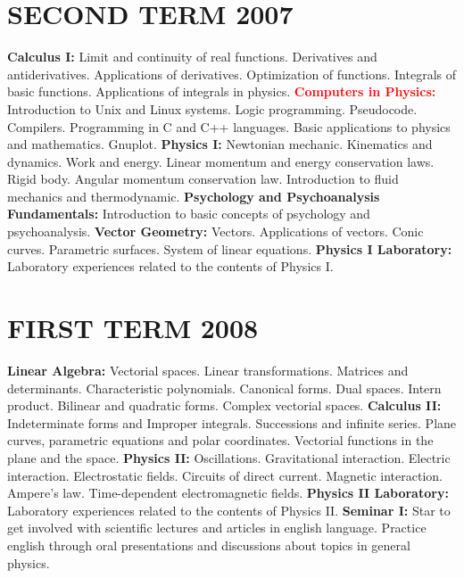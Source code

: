 \documentclass[10pt,a4paper]{moderncv}
\begin{document}
\section{\textsc{SECOND TERM 2007}}
	{ \textbf{Calculus I:} Limit and continuity of real functions. Derivatives and antiderivatives. 
	Applications of derivatives. Optimization of functions. Integrals of basic functions. 
	Applications of integrals in physics. }
	{  \textcolor{red}{\textbf{Computers in Physics:}} Introduction to Unix and Linux systems. 
	Logic programming. Pseudocode. Compilers. Programming in C and C++ languages. Basic applications 
	to physics and mathematics. Gnuplot. }
	{ \textbf{Physics I:} Newtonian mechanic. Kinematics and dynamics. Work and energy. Linear 
	momentum and energy conservation laws. Rigid body. Angular momentum conservation law. 
	Introduction to fluid mechanics and thermodynamic. }
	{ \textbf{Psychology and Psychoanalysis Fundamentals:} Introduction to basic concepts of 
	psychology and psychoanalysis. }
	{ \textbf{Vector Geometry:} Vectors. Applications of vectors. Conic curves. Parametric surfaces. 
	System of linear equations. }
	{ \textbf{Physics I Laboratory:} Laboratory experiences related to the contents of Physics I.  }

\vspace{0.5cm}


\section{\textsc{FIRST TERM 2008}}
	{ \textbf{Linear Algebra:} Vectorial spaces. Linear transformations. Matrices and determinants. 
	Characteristic polynomials. Canonical forms. Dual spaces. Intern product. Bilinear and quadratic 
	forms. Complex vectorial spaces.}
	{ \textbf{Calculus II:} Indeterminate forms and Improper integrals. Successions and infinite 
	series. Plane curves, parametric equations and polar coordinates. Vectorial functions in the 
	plane and the space. }
	{ \textbf{Physics II:} Oscillations. Gravitational interaction. Electric interaction. 
	Electrostatic fields. Circuits of direct current. Magnetic interaction. Ampere’s law. 
	Time-dependent electromagnetic fields. }
	{ \textbf{Physics II Laboratory:} Laboratory experiences related to the contents of Physics II.  }
	{ \textbf{Seminar I:} Star to get involved with scientific lectures and articles in english 
	language. Practice english through oral presentations and discussions about topics in general 
	physics. }

\vspace{0.5cm}
\end{document}
